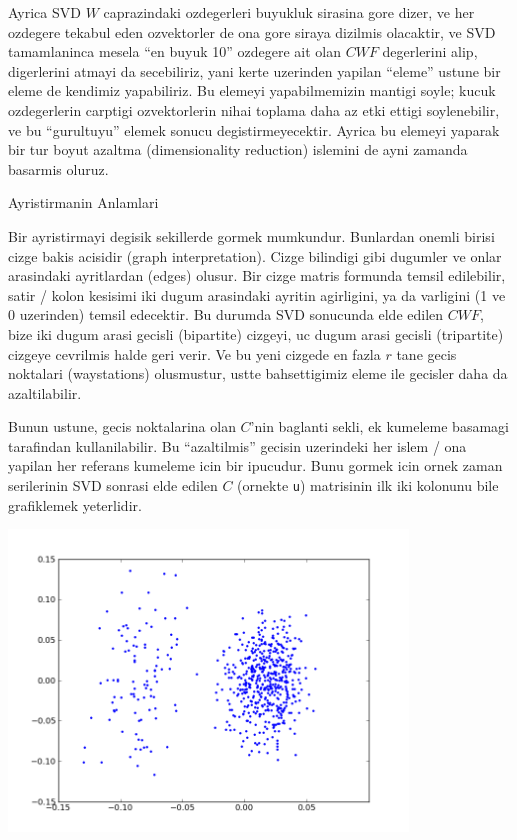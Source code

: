 \documentclass[12pt,fleqn]{article}\usepackage{../common}
\begin{document}
Ayrica SVD $W$ caprazindaki ozdegerleri buyukluk sirasina gore dizer, ve
her ozdegere tekabul eden ozvektorler de ona gore siraya dizilmis
olacaktir, ve SVD tamamlaninca mesela ``en buyuk 10'' ozdegere ait olan
$CWF$ degerlerini alip, digerlerini atmayi da secebiliriz, yani kerte
uzerinden yapilan ``eleme'' ustune bir eleme de kendimiz yapabiliriz. Bu
elemeyi yapabilmemizin mantigi soyle; kucuk ozdegerlerin carptigi
ozvektorlerin nihai toplama daha az etki ettigi soylenebilir, ve bu
``gurultuyu'' elemek sonucu degistirmeyecektir. Ayrica bu elemeyi yaparak
bir tur boyut azaltma (dimensionality reduction) islemini de ayni zamanda
basarmis oluruz.

Ayristirmanin Anlamlari

Bir ayristirmayi degisik sekillerde gormek mumkundur. Bunlardan onemli
birisi cizge bakis acisidir (graph interpretation). Cizge bilindigi gibi
dugumler ve onlar arasindaki ayritlardan (edges) olusur. Bir cizge matris
formunda temsil edilebilir, satir / kolon kesisimi iki dugum arasindaki
ayritin agirligini, ya da varligini (1 ve 0 uzerinden) temsil edecektir. Bu
durumda SVD sonucunda elde edilen $CWF$, bize iki dugum arasi gecisli
(bipartite) cizgeyi, uc dugum arasi gecisli (tripartite) cizgeye cevrilmis
halde geri verir. Ve bu yeni cizgede en fazla $r$ tane gecis noktalari
(waystations) olusmustur, ustte bahsettigimiz eleme ile gecisler daha da
azaltilabilir. 

Bunun ustune, gecis noktalarina olan $C$'nin baglanti sekli, ek kumeleme
basamagi tarafindan kullanilabilir. Bu ``azaltilmis'' gecisin uzerindeki
her islem / ona yapilan her referans kumeleme icin bir ipucudur. Bunu
gormek icin ornek zaman serilerinin SVD sonrasi elde edilen $C$ (ornekte
\verb!u!) matrisinin ilk iki kolonunu bile grafiklemek yeterlidir.



\includegraphics[height=8cm]{2d.png}
\end{document}
